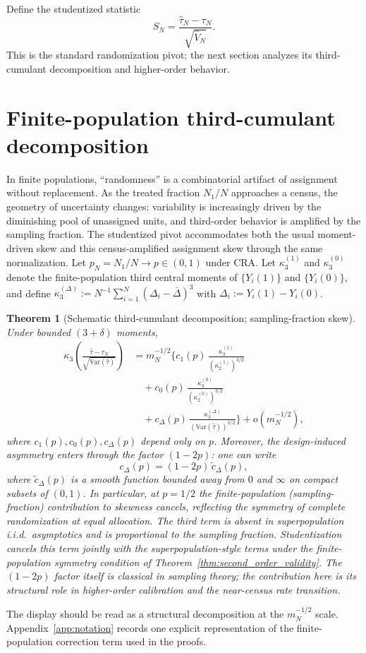 \documentclass[aos]{imsart}
\newtheorem{theorem}{Theorem}
\theoremstyle{definition}
\theoremstyle{plain}
\newcommand{\Var}{\mathbb{V}\mathrm{ar}}
\newcommand{\mN}{m_N}
\newcommand{\tauN}{\hat{\tau}_N}
\newcommand{\VN}{\hat V_N}
\newcommand{\SN}{S_N}
\begin{document}
Define the studentized statistic
\[
\SN = \frac{\tauN - \tau_N}{\sqrt{\VN}}.
\]
This is the standard randomization pivot; the next section analyzes its third-cumulant decomposition and higher-order behavior.



\section{Finite-population third-cumulant decomposition}\label{sec:cumulant-decomp}

In finite populations, ``randomness'' is a combinatorial artifact of assignment without replacement. As the treated fraction $N_1/N$ approaches a census, the geometry of uncertainty changes: variability is increasingly driven by the diminishing pool of unassigned units, and third-order behavior is amplified by the sampling fraction. The studentized pivot accommodates both the usual moment-driven skew and this census-amplified assignment skew through the same normalization.
Let $p_N=N_1/N\to p\in(0,1)$ under CRA. Let $\kappa_{3}^{(1)}$ and $\kappa_{3}^{(0)}$ denote the finite-population
third central moments of $\{Y_i(1)\}$ and $\{Y_i(0)\}$, and define
$\kappa_{3}^{(\Delta)} := N^{-1}\sum_{i=1}^N ( \Delta_i-\bar\Delta )^3$ with $\Delta_i:=Y_i(1)-Y_i(0)$.
\begin{theorem}[Schematic third-cumulant decomposition; sampling-fraction skew]\label{thm:cumulant}
Under bounded $(3+\delta)$ moments,
\[
\begin{aligned}
\kappa_3\!\left(\frac{\hat\tau-\tau_N}{\sqrt{\Var(\hat\tau)}}\right)
&=
\mN^{-1/2}\Big\{
c_1(p)\,\frac{\kappa_{3}^{(1)}}{(\kappa_{2}^{(1)})^{3/2}} \\
&\quad
+ c_0(p)\,\frac{\kappa_{3}^{(0)}}{(\kappa_{2}^{(0)})^{3/2}} \\
&\quad
+ c_\Delta(p)\,\frac{\kappa_{3}^{(\Delta)}}{(\Var(\hat\tau))^{3/2}}
\Big\}
+ o(\mN^{-1/2}),
\end{aligned}
\]
where $c_1(p),c_0(p),c_\Delta(p)$ depend only on $p$. Moreover, the \emph{design-induced asymmetry} enters through the factor $(1-2p)$: one can write
\[
 c_\Delta(p)=(1-2p)\,\tilde c_\Delta(p),
\]
where $\tilde c_\Delta(p)$ is a smooth function bounded away from $0$ and $\infty$ on compact subsets of $(0,1)$. In particular, at $p=1/2$ the finite-population (sampling-fraction) contribution to skewness cancels, reflecting the symmetry of complete randomization at equal allocation. The third term is absent in superpopulation i.i.d.\ asymptotics and
is proportional to the sampling fraction. Studentization cancels this term jointly with the superpopulation-style
terms under the finite-population symmetry condition of Theorem~\ref{thm:second_order_validity}.
The $(1-2p)$ factor itself is classical in sampling theory; the contribution here is its structural role in higher-order calibration and the near-census rate transition.
\end{theorem}
The display should be read as a structural decomposition at the $m_N^{-1/2}$ scale. Appendix~\ref{app:notation} records one explicit representation of the finite-population correction term used in the proofs.
\end{document}
